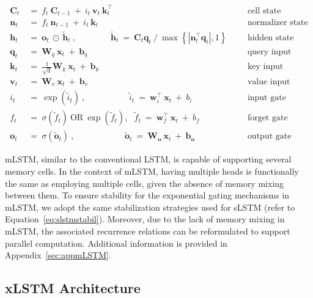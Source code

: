 \begin{align}
\label{eq:mlstm_recurrent_begin}
\mathbf{C}_t \ &= \  f_t \ \mathbf{C}_{t-1} \ + \ 
  i_t \ \mathbf{v}_t \ \mathbf{k}_t^\top & &  &\text{cell state} \\
\mathbf{n}_t \ &= \  f_t \ \mathbf{n}_{t-1} \ + \ 
  i_t \ \mathbf{k}_t & &  &\text{normalizer state} \\
\mathbf{h}_t  \ &= \ \mathbf{o}_t \ \odot \ \tilde{\mathbf{h}}_t
\ , \qquad \qquad 
\tilde{\mathbf{h}}_t \ = \   \mathbf{C}_t \mathbf{q}_t \ / \ 
  \max \left\{ |\mathbf{n}_t^\top \mathbf{q}_t|, 1 \right\} 
   &&&\text{hidden state} \\
\mathbf{q}_t \ &= \ \mathbf{W}_q \ \mathbf{x}_t \ + \ \mathbf{b}_q  & &  &\text{query input} \\
\mathbf{k}_t \ &= \ \frac{1}{\sqrt{d}} \mathbf{W}_k \ \mathbf{x}_t \ + \ \mathbf{b}_k  & &  &\text{key input} \\
\mathbf{v}_t \ &= \ \mathbf{W}_v \ \mathbf{x}_t \ + \ \mathbf{b}_v  & &  &\text{value input} \\
i_t \ &= \ \!\exp \!  \! \left( \tilde{i}_t  \right) \ , 
 \qquad \qquad \ \ \ \ \,
  \tilde{i}_t \ = \ \mathbf{w}^\top_{i} \ \mathbf{x}_t \ + \  b_{i} \ \ \ 
  &&&\text{input gate} \\
f_t \ &= \ \sigma \!  \left(  \tilde{f}_t \right) \ \text{OR} \ \!\exp \!  \! \left(  \tilde{f}_t \right) , \ \ \: \!
\tilde{f}_t \ = \ \mathbf{w}^\top_{f} \ \mathbf{x}_t  \ + \
  b_{f}
  &&& \text{forget gate} \\
\label{eq:mlstm_recurrent_end}
\mathbf{o}_t \ &= \ \sigma \left( \tilde{\mathbf{o}}_t \right) \ , \qquad \qquad \quad \ \ \ \,
  \tilde{\mathbf{o}}_t  \ = \ \mathbf{W}_{\mathbf{o}} \ \mathbf{x}_t \ + \
  \mathbf{b}_{\mathbf{o}}
  &&&\text{output gate} 
\end{align}

mLSTM, similar to the conventional LSTM, is capable of supporting several memory cells. In the context of mLSTM, having multiple heads is functionally the same as employing multiple cells, given the absence of memory mixing between them. To ensure stability for the exponential gating mechanisms in mLSTM, we adopt the same stabilization strategies used for sLSTM (refer to Equation~\ref{eq:slstmstabil}). Moreover, due to the lack of memory mixing in mLSTM, the associated recurrence relations can be reformulated to support parallel computation. Additional information is provided in Appendix~\ref{sec:appmLSTM}.

\subsection{xLSTM Architecture}
\label{sec:xLSTMarch}

